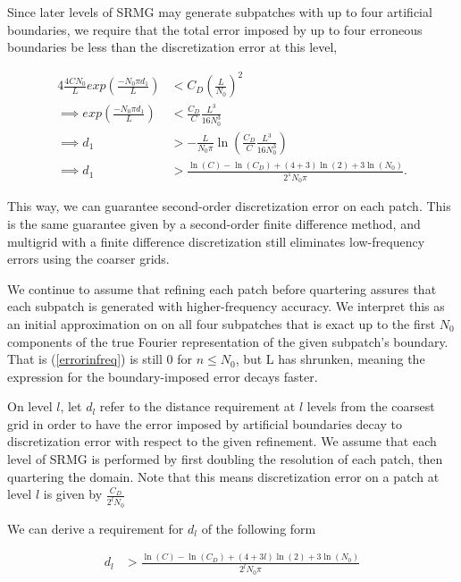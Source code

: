 \documentclass[final]{siamart1116}
\numberwithin{theorem}{section}
\begin{document}
Since later levels of SRMG may generate subpatches with up to four artificial boundaries, we require that the total error imposed by up to four erroneous boundaries be less than the discretization error at this level,

\begin{align}
  4 \frac{4C N_0}{L} exp(\frac{-N_0 \pi d_1}{L}) &< C_D \left(\frac{L}{N_0}\right)^2 \nonumber \\
 \implies  exp(\frac{-N_0 \pi d_1}{L}) &< \frac{C_D}{C} \frac{L^3}{16 N^3_0} \nonumber \\
  \implies d_1 &> -\frac{L}{N_0 \pi} \ln\left(\frac{C_D}{C} \frac{L^3}{16 N^3_0}\right) \nonumber \\
 \implies  d_1 &> \frac{\ln(C) - \ln(C_D) + (4+3) \ln(2) + 3 \ln(N_0)}{2^1 N_0 \pi}. 
\end{align}

This way, we can guarantee second-order discretization error on each patch. This is the same guarantee given by a second-order finite difference method, and multigrid with a finite difference discretization still eliminates low-frequency errors using the coarser grids. 

We continue to assume that refining each patch before quartering assures that each subpatch is generated with higher-frequency accuracy. We interpret this as an initial approximation on on all four subpatches that is exact up to the first $N_0$ components of the true Fourier representation of the given subpatch's boundary. That is (\ref{errorinfreq}) is still 0 for $n \leq N_0$, but L has shrunken, meaning the expression for the boundary-imposed error decays faster. 

On level $l$, let $d_l$ refer to the distance requirement at $l$ levels from the coarsest grid in order to have the error imposed by artificial boundaries decay to discretization error with respect to the given refinement. We assume that each level of SRMG is performed by first doubling the resolution of each patch, then quartering the domain. Note that this means discretization error on a patch at level $l$ is given by $\frac{C_D}{2^l N_0}$

We can derive a requirement for $d_l$ of the following form




\begin{align}
  d_l &> \frac{\ln(C) - \ln(C_D) + (4+3l) \ln(2) + 3 \ln(N_0)}{2^l N_0 \pi} \label{singlebuffer}
\end{align}
\end{document}
